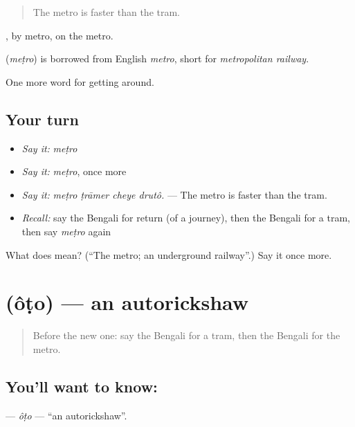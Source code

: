\begin{quote}
The metro is faster than the tram.
\end{quote}

, by metro, on the metro.

\begin{cousinweb}
\textbf{} (\emph{meṭro}) is borrowed from English \emph{metro}, short for \emph{metropolitan railway}.
\end{cousinweb}

\begin{grammarlens}[title={What you've built}]
One more word for getting around.
\end{grammarlens}

\subsection*{Your turn}
\begin{itemize}
\raggedright
  \item \emph{Say it:} \emph{meṭro}
  \item \emph{Say it:} \emph{meṭro}, once more
  \item \emph{Say it:} \emph{meṭro ṭrāmer cheye drutô.} — The metro is faster than the tram.
  \item \emph{Recall:} say the Bengali for return (of a journey), then the Bengali for a tram, then say \emph{meṭro} again
\end{itemize}

\begin{tcolorbox}[breakable,colback=teal!4,colframe=teal!35!black,title={Before you move on}]
What does  mean? (\textquotedblleft{}The metro; an underground railway\textquotedblright{}.) Say it once more.
\end{tcolorbox}
\section[\texorpdfstring{\bn{অটো} (ôṭo)}{অটো (ôṭo)}]{ (ôṭo) — an autorickshaw}

\label{lesson:BN-C388-oto}



\begin{quote}
Before the new one: say the Bengali for a tram, then the Bengali for the metro.
\end{quote}

\subsection*{You'll want to know: }
\textbf{} — \emph{ôṭo} — \textquotedblleft{}an autorickshaw\textquotedblright{}.

